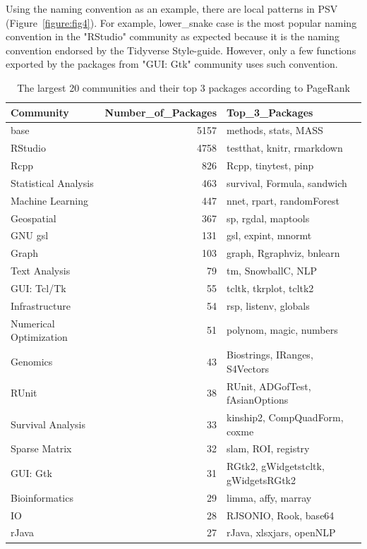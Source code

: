 Using the naming convention as an example, there are local patterns in PSV (Figure~\ref{figure:fig4}). For example, lower\_snake case is the most popular naming convention in the "RStudio" community as expected because it is the naming convention endorsed by the Tidyverse Style-guide. However, only a few functions exported by the packages from "GUI: Gtk" community uses such convention.

\begin{table}

\caption{\label{tab:table2}The largest 20 communities and their top 3 packages according to PageRank}
\centering
\begin{tabular}[t]{l|r|l}
\hline
Community & Number\_of\_Packages & Top\_3\_Packages\\
\hline
base & 5157 & methods, stats, MASS\\
\hline
RStudio & 4758 & testthat, knitr, rmarkdown\\
\hline
Rcpp & 826 & Rcpp, tinytest, pinp\\
\hline
Statistical Analysis & 463 & survival, Formula, sandwich\\
\hline
Machine Learning & 447 & nnet, rpart, randomForest\\
\hline
Geospatial & 367 & sp, rgdal, maptools\\
\hline
GNU gsl & 131 & gsl, expint, mnormt\\
\hline
Graph & 103 & graph, Rgraphviz, bnlearn\\
\hline
Text Analysis & 79 & tm, SnowballC, NLP\\
\hline
GUI: Tcl/Tk & 55 & tcltk, tkrplot, tcltk2\\
\hline
Infrastructure & 54 & rsp, listenv, globals\\
\hline
Numerical Optimization & 51 & polynom, magic, numbers\\
\hline
Genomics & 43 & Biostrings, IRanges, S4Vectors\\
\hline
RUnit & 38 & RUnit, ADGofTest, fAsianOptions\\
\hline
Survival Analysis & 33 & kinship2, CompQuadForm, coxme\\
\hline
Sparse Matrix & 32 & slam, ROI, registry\\
\hline
GUI: Gtk & 31 & RGtk2, gWidgetstcltk, gWidgetsRGtk2\\
\hline
Bioinformatics & 29 & limma, affy, marray\\
\hline
IO & 28 & RJSONIO, Rook, base64\\
\hline
rJava & 27 & rJava, xlsxjars, openNLP\\
\hline
\end{tabular}
\end{table}

